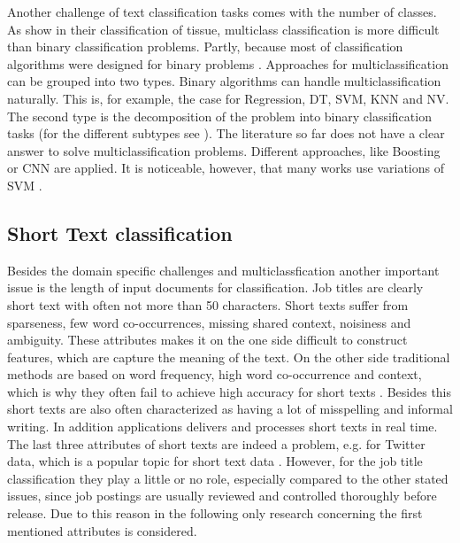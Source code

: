 \documentclass[12pt, a4paper, titlepage]{article}
\begin{document}
Another challenge of text classification tasks comes with the number of classes. As \cite{Li2004} show in their classification of tissue, multiclass classification is more difficult than binary classification problems. Partly, because most of classification algorithms were designed for binary problems \citep{Aly2005}. Approaches for multiclassification can be grouped into two types. Binary algorithms can handle multiclassification naturally. This is, for example, the case for Regression, DT, SVM, KNN and NV. The second type is the decomposition of the problem into binary classification tasks (for the different subtypes see \cite{Aly2005}). The literature so far does not have a clear answer to solve multiclassification problems. Different approaches, like Boosting \citep{Schapire2000} or CNN \citep{Farooq2017} are applied. It is noticeable, however, that many works use variations of SVM \citep{Guo2015,Tomar2015,Tang2019}.  

\subsection{Short Text classification} 
Besides the domain specific challenges and multiclassfication another important issue is the length of input documents for classification. Job titles are clearly short text with often not more than 50 characters. Short texts suffer from sparseness, few word co-occurrences, missing shared context, noisiness and ambiguity. These attributes makes it on the one side difficult to construct features, which are capture the meaning of the text. On the other side traditional methods are based on word frequency, high word co-occurrence and context, which is why they often fail to achieve high accuracy for short texts \citep{Song2014, WangY2017, WangF2014,  alsmadi2019}. Besides this short texts are also often characterized as having a lot of misspelling and informal writing. In addition applications delivers and processes short texts in real time. The last three attributes of short texts are indeed a problem, e.g. for Twitter data, which is a popular topic for short text data \citep{karimi2013, sriram2010, yan2018}.  However, for the job title classification they play a little or no role, especially compared to the other stated issues, since job postings are usually reviewed and controlled thoroughly before release. Due to this reason in the following only research concerning the first mentioned attributes is considered. 
\end{document}
